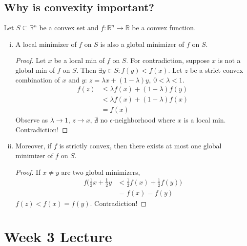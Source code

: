 \documentclass[11pt]{article}
\numberwithin{equation}{section}
\begin{document}
\subsection{Why is convexity important?}
\begin{proposition}
    Let $S \subseteq \mathbb{R}^n$ be a convex set and $f:\mathbb{R}^n\rightarrow \mathbb{R}$ be a convex function.
    \begin{enumerate}[(i)]
        \item A local minimizer of $f$ on $S$ is also a global minimizer of $f$ on $S$.
        \begin{proof}
            Let $x$ be a local min of $f$ on $S$. For contradiction, suppose $x$ is not a global min of $f$ on $S$. Then $\exists y \in S:f(y)<f(x)$. 
            Let $z$ be a strict convex combination of $x$ and $y$: $z=\lambda x + (1-\lambda)y, \ 0<\lambda<1$.
            \begin{align*}
                f(z)&\leq \lambda f(x) + (1-\lambda)f(y) \\
                &< \lambda f(x) + (1-\lambda)f(x) \\
                &= f(x)
            \end{align*}
            Observe as $\lambda \rightarrow1$, $z\rightarrow x$, $\nexists$ no $\epsilon$-neighborhood where $x$ is a local min. Contradiction!
        \end{proof}
        \item Moreover, if $f$ is strictly convex, then there exists at most one global minimizer of $f$ on $S$.
        \begin{proof}
            If $x \neq y$ are two global minimizers,
            \begin{align*}
                f(\frac{1}{2}x+\frac{1}{2}y&<\frac{1}{2}f(x)+\frac{1}{2}f(y))\\
                &=f(x)=f(y)
            \end{align*}
            $f(z)<f(x)=f(y)$. Contradiction!
        \end{proof}
    \end{enumerate}
\end{proposition}



\newpage
\section{Week 3 Lecture}
\end{document}
